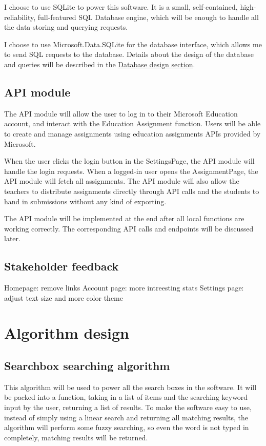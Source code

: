 \documentclass[a4paper]{report}
\begin{document}
I choose to use SQLite to power this software. It is a small, self-contained, high-reliability, full-featured SQL Database engine, which will be enough to handle all the data storing and querying requests.

I choose to use Microsoft.Data.SQLite for the database interface, which allows me to send SQL requests to the database. Details about the design of the database and queries will be described in the \hyperref[subsec:database design]{Database design section}.

\subsection{API module}

The API module will allow the user to log in to their Microsoft Education account, and interact with the Education Assignment function. Users will be able to create and manage assignments using education assignments APIs provided by Microsoft.

When the user clicks the login button in the SettingsPage, the API module will handle the login requests. When a logged-in user opens the AssignmentPage, the API module will fetch all assignments. The API module will also allow the teachers to distribute assignments directly through API calls and the students to hand in submissions without any kind of exporting.

The API module will be implemented at the end after all local functions are working correctly. The corresponding API calls and endpoints will be discussed later.

\subsection{Stakeholder feedback}

Homepage: remove links
Account page: more intreesting stats
Settings page: adjust text size and more color theme

\section{Algorithm design}
\label{sec:algorithm design}

\subsection{Searchbox searching algorithm}

This algorithm will be used to power all the search boxes in the software. It will be packed into a function, taking in a list of items and the searching keyword input by the user, returning a list of results. To make the software easy to use, instead of simply using a linear search and returning all matching results, the algorithm will perform some fuzzy searching, so even the word is not typed in completely, matching results will be returned.
\end{document}
